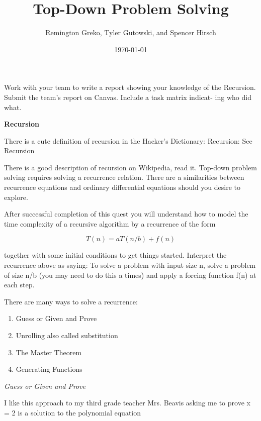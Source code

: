 \documentclass{article}
\begin{document}
\title{\textbf{Top-Down Problem Solving}}
\author{Remington Greko, Tyler Gutowski, and Spencer Hirsch}
\date{\today}

\maketitle

Work with your team to write a report showing your knowledge of
the Recursion.
Submit the team’s report on Canvas. Include a task matrix indicat-
ing who did what.

\textbf{Recursion}

There is a cute definition of recursion in the Hacker’s Dictionary: Recursion: See Recursion

\smallskip

There is a good description of recursion on Wikipedia, read it.
Top-down problem solving requires solving a recurrence relation.
There are a similarities between recurrence equations and ordinary
differential equations should you desire to explore.

\smallskip

After successful completion of this quest you will understand
how to model the time complexity of a recursive algorithm by a
recurrence of the form

\[T(n) = aT(n/b) + f(n)\]

together with some initial conditions to get things started.
Interpret the recurrence above as saying:
To solve a problem with input size n, solve a problem of size n/b
(you may need to do this a times) and apply a forcing function f(n)
at each step.

There are many ways to solve a recurrence:

\begin{enumerate}
    \item Guess or Given and Prove
    \item Unrolling also called substitution
    \item The Master Theorem
    \item Generating Functions
\end{enumerate}

\pagebreak

\noindent \textit{Guess or Given and Prove}

\smallskip

I like this approach to my third grade teacher Mrs. Beavis asking
me to prove x = 2 is a solution to the polynomial equation
\end{document}
